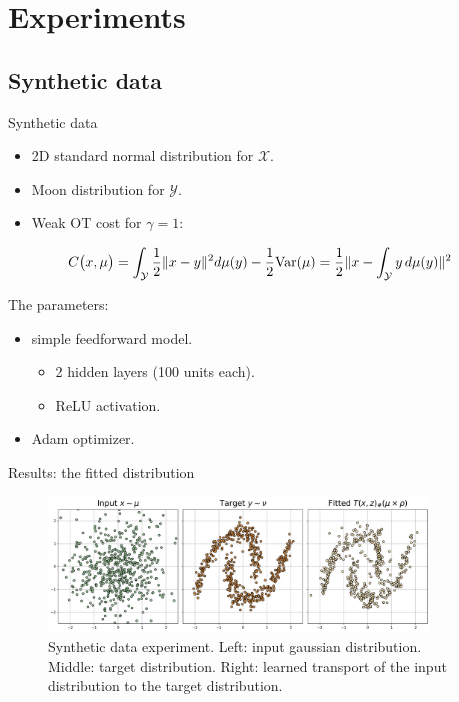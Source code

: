 \documentclass[aspectratio=169]{beamer}
\begin{document}
\section{Experiments}

\subsection{Synthetic data}
\begin{frame}{Synthetic data}
    \begin{itemize}
        \item 2D standard normal distribution for $\mathcal{X}$.
        \item Moon distribution for $\mathcal{Y}$.
        \item Weak OT cost for $\gamma = 1$:
    \end{itemize}
    \begin{equation}
        C\big{(}x,\mu\big{)}=\int_{\mathcal{Y}}\frac{1}{2}\|x-y\|^{2}d\mu(y)-\frac{1}{2} \text{Var}(\mu)=\frac{1}{2}\|x-\int_{\mathcal{Y}}y\,d\mu(y)\|^{2}
        \label{eq:toy_cost}
    \end{equation}

    The parameters:
    \begin{itemize}
        \item simple feedforward model.
              \begin{itemize}
                  \item 2 hidden layers (100 units each).
                  \item ReLU activation.
              \end{itemize}
        \item Adam optimizer.
    \end{itemize}
\end{frame}

\begin{frame}{Results: the fitted distribution}
    \begin{figure}[H]
        \centering
        \includegraphics[width=0.9\textwidth]{figures/toy_1.png}
        \caption{Synthetic data experiment. Left: input gaussian distribution. Middle: target distribution. Right: learned transport of the input distribution to the target distribution.}
        \label{fig:toy_1}
    \end{figure}
\end{frame}
\end{document}
